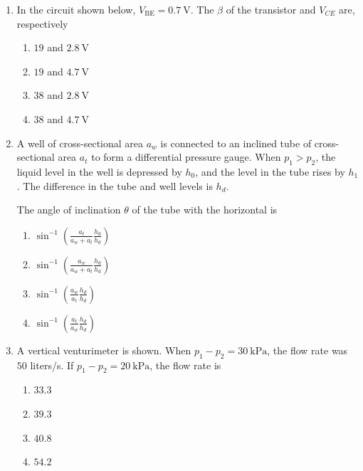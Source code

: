 \documentclass[journal]{IEEEtran}
\begin{document}
\begin{enumerate}
\item In the circuit shown below, $V_{\mathrm{BE}} = 0.7\ \mathrm{V}$. The $\beta$ of the transistor and $V_{CE}$ are, respectively

\begin{multicols}{4}
\begin{enumerate}
\item $19$ and $2.8\ \mathrm{V}$  
\item $19$ and $4.7\ \mathrm{V}$  
\item $38$ and $2.8\ \mathrm{V}$  
\item $38$ and $4.7\ \mathrm{V}$  
\end{enumerate}
\end{multicols}

\item A well of cross-sectional area $a_w$ is connected to an inclined tube of cross-sectional area $a_t$ to form a differential pressure gauge. When $p_1 > p_2$, the liquid level in the well is depressed by $h_0$, and the level in the tube rises by $h_1$. The difference in the tube and well levels is $h_d$.  

The angle of inclination $\theta$ of the tube with the horizontal is  

\begin{multicols}{2}
\begin{enumerate}
\item $\sin^{-1}\left(\tfrac{a_t}{a_w+a_t}\tfrac{h_d}{h_d}\right)$  
\item $\sin^{-1}\left(\tfrac{a_w}{a_w+a_t}\tfrac{h_d}{h_d}\right)$  
\item $\sin^{-1}\left(\tfrac{a_w}{a_t}\tfrac{h_d}{h_d}\right)$  
\item $\sin^{-1}\left(\tfrac{a_t}{a_w}\tfrac{h_d}{h_d}\right)$  
\end{enumerate}
\end{multicols}

\item A vertical venturimeter is shown. When $p_1 - p_2 = 30\ \mathrm{kPa}$, the flow rate was $50$ liters/s. If $p_1 - p_2 = 20\ \mathrm{kPa}$, the flow rate is  

\begin{multicols}{4}
\begin{enumerate}
\item $33.3$  
\item $39.3$  
\item $40.8$  
\item $54.2$  
\end{enumerate}
\end{multicols}


\end{enumerate}
\end{document}
